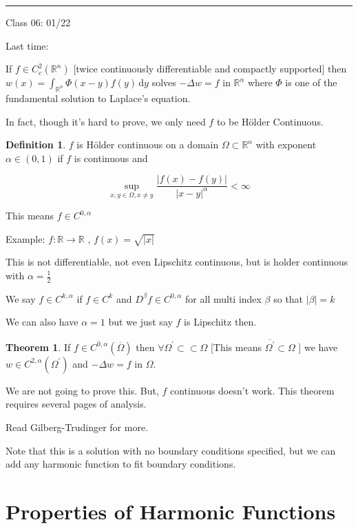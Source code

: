 \documentclass{article}
\theoremstyle{definition}
\newtheorem{definition}{Definition}
\newtheorem{theorem}{Theorem}
\begin{document}
\hfil
\hrule

Class 06: 01/22

Last time:

If \(f\in C^2_c(\mathbb{R}^n)\) [twice continuously differentiable and compactly supported] then \(w(x)=\int_{\mathbb{R} ^n}^{} \Phi(x-y)f(y) \,\mathrm{d}y \) solves \(-\Delta w=f\) in \(\mathbb{R}^n\) where \(\Phi\) is one of the fundamental solution to Laplace's equation.

In fact, though it's hard to prove, we only need \(f\) to be H\"older Continuous.

\begin{definition}
    \(f\) is H\"older continuous on a domain \(\Omega \subset \mathbb{R} ^n\) with exponent \(\alpha \in (0,1)\) if \(f\) is continuous and

    \[
        \sup _{ x,y\in \Omega, x\neq y } \frac{\vert f(x) - f(y) \vert }{\vert x-y \vert^\alpha } < \infty
    \]
\end{definition}

This means \(f\in C^{0,\alpha}\) 

Example: \(f:\mathbb{R} \to \mathbb{R}\) , \(f(x)=\sqrt{\vert x \vert } \) 

This is not differentiable, not even Lipschitz continuous, but is holder continuous with \(\alpha = \frac{1}{2}\) 

We say \(f\in C^{k,\alpha}\) if \(f\in C^k\) and \(D^\beta f\in C^{0,\alpha}\) for all multi index \(\beta \) so that \(\vert \beta  \vert = k\) 

We can also have \(\alpha =1\) but we just say \(f\) is Lipschitz then.

\begin{theorem}
    If \(f\in C^{0,\alpha}(\overline{\Omega} )\) then \(\forall \Omega ^{\prime} \subset \subset \Omega \) [This means \(\overline{\Omega ^{\prime} } \subset \Omega \) ] we have \(w\in C^{2,\alpha }(\Omega ^{\prime} )\) and \(-\Delta w = f\) in \(\Omega\).
\end{theorem}

We are not going to prove this. But, \(f\) continuous doesn't work. This theorem requires several pages of analysis.

Read Gilberg-Trudinger for more.

Note that this is a solution with no boundary conditions specified, but we can add any harmonic function to fit boundary conditions.

\section*{Properties of Harmonic Functions}
\end{document}

